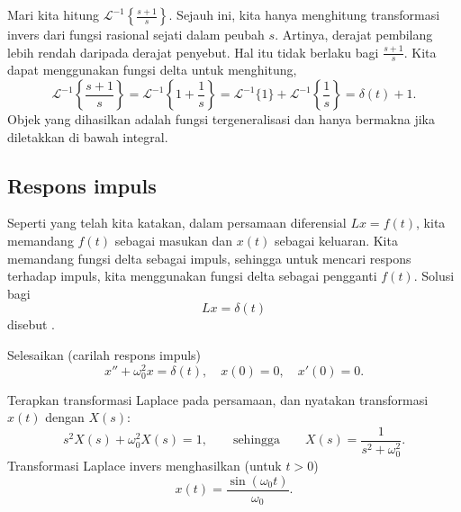\begin{example}
Mari kita hitung ${\mathcal{L}}^{-1} \left\{ \frac{s+1}{s} \right\}$.
Sejauh ini, kita hanya menghitung transformasi invers dari
fungsi rasional sejati dalam peubah $s$.
Artinya, derajat pembilang lebih rendah daripada derajat penyebut.
Hal itu tidak berlaku bagi $\frac{s+1}{s}$.
Kita dapat menggunakan fungsi delta untuk menghitung,
\begin{equation*}
{\mathcal{L}}^{-1} \left\{ \frac{s+1}{s} \right\}
=
{\mathcal{L}}^{-1} \left\{ 1 + \frac{1}{s} \right\}
=
{\mathcal{L}}^{-1} \{ 1 \}
+
{\mathcal{L}}^{-1} \left\{ \frac{1}{s} \right\}
=
\delta(t) + 1 .
\end{equation*}
Objek yang dihasilkan adalah fungsi
tergeneralisasi dan hanya bermakna jika diletakkan di bawah integral.
\end{example}

\subsection{Respons impuls}

Seperti yang telah kita katakan, dalam persamaan diferensial
$L x = f(t)$,
kita memandang $f(t)$ sebagai masukan dan $x(t)$ sebagai keluaran.
Kita memandang fungsi delta sebagai impuls, sehingga
untuk mencari respons terhadap impuls, kita menggunakan
fungsi delta sebagai pengganti $f(t)$.
Solusi bagi
\begin{equation*}
L x = \delta(t)
\end{equation*}
disebut
\emph{}.

\begin{example}
Selesaikan (carilah respons impuls)
\begin{equation} \label{eq:lteximpulseresp}
x'' + \omega_0^2 x = \delta(t) , \quad x(0) = 0, \quad x'(0) = 0 .
\end{equation}

Terapkan transformasi Laplace pada persamaan, dan nyatakan
transformasi $x(t)$ dengan $X(s)$:
\begin{equation*}
s^2 X(s) + \omega_0^2 X(s) = 1 ,
\qquad \text{sehingga} \qquad
X(s) = \frac{1}{s^2+ \omega_0^2} .
\end{equation*}
Transformasi Laplace invers menghasilkan (untuk $t > 0$)
\begin{equation*}
x(t) = 
\frac{\sin (\omega_0 t)}{\omega_0} .
\end{equation*}
\end{example}

